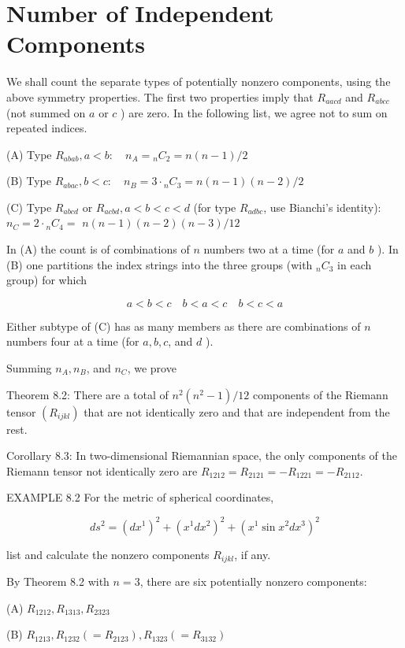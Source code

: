 \documentclass[10pt]{article}
\begin{document}
\section*{Number of Independent Components}
We shall count the separate types of potentially nonzero components, using the above symmetry properties. The first two properties imply that $R_{a a c d}$ and $R_{a b c c}$ (not summed on $a$ or $c$ ) are zero. In the following list, we agree not to sum on repeated indices.

(A) Type $R_{a b a b}, a<b: \quad n_{A}={ }_{n} C_{2}=n(n-1) / 2$

(B) Type $R_{a b a c}, b<c: \quad n_{B}=3 \cdot{ }_{n} C_{3}=n(n-1)(n-2) / 2$

(C) Type $R_{a b c d}$ or $R_{a c b d}, a<b<c<d$ (for type $R_{a d b c}$, use Bianchi's identity): $n_{C}=2 \cdot{ }_{n} C_{4}=$ $n(n-1)(n-2)(n-3) / 12$

In (A) the count is of combinations of $n$ numbers two at a time (for $a$ and $b$ ). In (B) one partitions the index strings into the three groups (with ${ }_{n} C_{3}$ in each group) for which

$$
a<b<c \quad b<a<c \quad b<c<a
$$

Either subtype of (C) has as many members as there are combinations of $n$ numbers four at a time (for $a, b, c$, and $d$ ).

Summing $n_{A}, n_{B}$, and $n_{C}$, we prove

Theorem 8.2: There are a total of $n^{2}\left(n^{2}-1\right) / 12$ components of the Riemann tensor $\left(R_{i j k l}\right)$ that are not identically zero and that are independent from the rest.

Corollary 8.3: In two-dimensional Riemannian space, the only components of the Riemann tensor not identically zero are $R_{1212}=R_{2121}=-R_{1221}=-R_{2112}$.

EXAMPLE 8.2 For the metric of spherical coordinates,

$$
d s^{2}=\left(d x^{1}\right)^{2}+\left(x^{1} d x^{2}\right)^{2}+\left(x^{1} \sin x^{2} d x^{3}\right)^{2}
$$

list and calculate the nonzero components $R_{i j k l}$, if any.

By Theorem 8.2 with $n=3$, there are six potentially nonzero components:

(A) $R_{1212}, R_{1313}, R_{2323}$

(B) $R_{1213}, R_{1232}\left(=R_{2123}\right), R_{1323}\left(=R_{3132}\right)$
\end{document}
